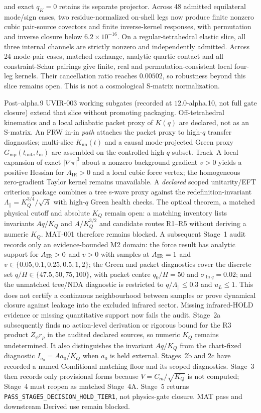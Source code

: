 and exact $q_K=0$ retains its separate projector.  Across 48 admitted
equilateral mode/sign cases, two residue-normalized on-shell legs now produce
finite nonzero cubic pair-source covectors and finite inverse-kernel
responses, with permutation and inverse closure below $6.2\times10^{-16}$.
On a regular-tetrahedral elastic slice, all three internal channels are
strictly nonzero and independently admitted.  Across 24 mode-pair cases,
matched exchange, analytic quartic contact and all constraint-Schur pairings
give finite, real and permutation-consistent local four-leg kernels.  Their
cancellation ratio reaches $0.00502$, so robustness beyond this slice remains
open.  This is not a cosmological S-matrix normalization.

Post--alpha.9 UVIR-003 working subgates (recorded at $12.0$-alpha.10, not full
gate closure) extend that slice without promoting packaging.  Off-tetrahedral
kinematics and a local adiabatic packet proxy of $K(q)$ are declared, not as
an S-matrix.  An FRW in-in \emph{path} attaches the packet proxy to high-$q$
transfer diagnostics; multi-slice $K_{\mathrm{nn}}(t)$ and a causal
mode-projected Green proxy $G_{\mathrm{mp}}(t_{\mathrm{out}},t_{\mathrm{in}})$
are assembled on the controlled high-$q$ subset.  Track~A local expansion of
exact $|\nabla\pi|^3$ about a nonzero background gradient $v>0$ yields a
positive Hessian for $A_{\mathrm{IR}}>0$ and a local cubic force vertex; the
homogeneous zero-gradient Taylor kernel remains unavailable.  A
\emph{declared} scoped unitarity/EFT criterion package combines a tree
s-wave proxy against the redefinition-invariant
$\Lambda_\parallel=K_Q^{3/4}/\sqrt{A}$ with high-$q$ Green health checks.
The optical theorem, a matched physical cutoff and absolute $K_Q$ remain
open: a matching inventory lists invariants $Aq/K_Q$ and $A/K_Q^{3/2}$ and
candidate routes R1--R5 without deriving a numeric $K_Q$.  MAT-001 therefore
remains blocked.  A subsequent Stage~1 audit records only an
evidence-bounded M2 domain: the force result has analytic support for
$A_{\rm IR}>0$ and $v>0$ with samples at $A_{\rm IR}=1$ and
$v\in\{0.05,0.1,0.25,0.5,1,2\}$; the Green and packet diagnostics cover the
discrete set $q/H\in\{47.5,50,75,100\}$, with packet centre $q_0/H=50$ and
$\sigma_{\ln q}=0.02$; and the unmatched tree/NDA diagnostic is restricted to
$q/\Lambda_\parallel\leq0.3$ and $u_L\leq1$.  This does not certify a
continuous neighbourhood between samples or prove dynamical closure against
leakage into the excluded infrared sector.  Missing infrared-HOLD evidence or
missing quantitative support now fails the audit.  Stage~2a subsequently
finds no action-level derivation or rigorous bound for the R3 product
$Z_\psi r_\rho$ in the audited declared sources, so numeric $K_Q$ remains
undetermined.  It also distinguishes the invariant $Aq/K_Q$ from the
chart-fixed diagnostic $I_{a_0}=A a_0/K_Q$ when $a_0$ is held external.
Stages~2b and 2c have recorded a named Conditional matching floor and its
scoped diagnostics.  Stage~3 then records only provisional forms because
$V=C_m/\sqrt{K_Q}$ is not computed; Stage~4 must reopen as matched Stage~4A.
Stage~5 returns \texttt{PASS\_STAGE5\_DECISION\_HOLD\_TIER1}, not physics-gate
closure.  MAT pass and downstream Derived use remain blocked.

